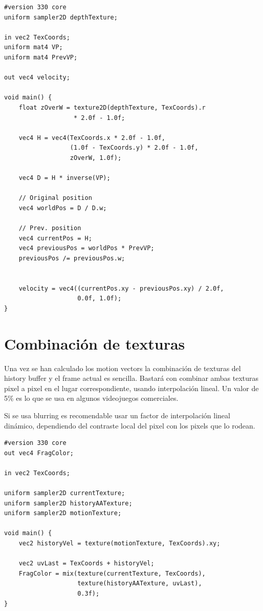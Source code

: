 \documentclass[withindex, glossary]{cam-thesis}
\begin{document}
\begin{verbatim}
#version 330 core
uniform sampler2D depthTexture;

in vec2 TexCoords;
uniform mat4 VP;
uniform mat4 PrevVP;

out vec4 velocity;

void main() {
    float zOverW = texture2D(depthTexture, TexCoords).r
                   * 2.0f - 1.0f;

    vec4 H = vec4(TexCoords.x * 2.0f - 1.0f,
                  (1.0f - TexCoords.y) * 2.0f - 1.0f,
                  zOverW, 1.0f);

    vec4 D = H * inverse(VP);

    // Original position
    vec4 worldPos = D / D.w;

    // Prev. position
    vec4 currentPos = H;
    vec4 previousPos = worldPos * PrevVP;
    previousPos /= previousPos.w;


    velocity = vec4((currentPos.xy - previousPos.xy) / 2.0f,
                    0.0f, 1.0f);
}
\end{verbatim}

\section{Combinación de texturas}

Una vez se han calculado los motion vectors la combinación de texturas del history buffer y el frame actual es sencilla. Bastará con combinar ambas texturas pixel a pixel en el lugar correspondiente, usando interpolación lineal. Un valor de 5\% es lo que se usa en algunos videojuegos\cite{uncharted4} comerciales.

Si se usa blurring es recomendable usar un factor de interpolación lineal dinámico, dependiendo del contraste local del pixel con los pixels que lo rodean.

\begin{verbatim}
#version 330 core
out vec4 FragColor;

in vec2 TexCoords;

uniform sampler2D currentTexture;
uniform sampler2D historyAATexture;
uniform sampler2D motionTexture;

void main() {
    vec2 historyVel = texture(motionTexture, TexCoords).xy;

    vec2 uvLast = TexCoords + historyVel;
    FragColor = mix(texture(currentTexture, TexCoords),
                    texture(historyAATexture, uvLast),
                    0.3f);
}
\end{verbatim}
\end{document}
